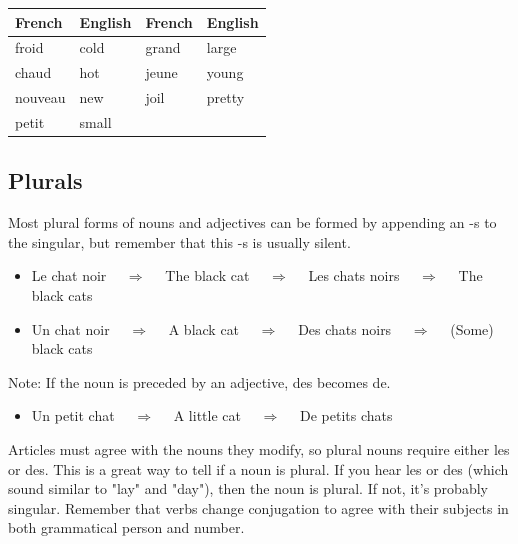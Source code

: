 \begin{center}\begin{tabular}{l|l||l|l}
\textbf{French} & \textbf{English} & \textbf{French} & \textbf{English} \\ \hline
froid & cold & grand & large \\
chaud & hot & jeune & young \\
nouveau & new & joil & pretty \\
petit & small \\
\end{tabular}\end{center}


\pagebreak
\subsection{Plurals}

Most plural forms of nouns and adjectives can be formed by appending an -s to the singular, but remember that this -s is usually silent.

\begin{itemize}
  \item  Le chat noir $\quad\Rightarrow\quad$ The black cat $\quad\Rightarrow\quad$ Les chats noirs $\quad\Rightarrow\quad$ The black cats
  \item  Un chat noir $\quad\Rightarrow\quad$ A black cat $\quad\Rightarrow\quad$ Des chats noirs $\quad\Rightarrow\quad$ (Some) black cats
\end{itemize}

Note: If the noun is preceded by an adjective, des becomes de.

\begin{itemize}
  \item  Un petit chat $\quad\Rightarrow\quad$ A little cat $\quad\Rightarrow\quad$ De petits chats
\end{itemize}

Articles must agree with the nouns they modify, so plural nouns require either les or des. This is a great way to tell if a noun is plural. If you hear les or des (which sound similar to "lay" and "day"), then the noun is plural. If not, it's probably singular.  Remember that verbs change conjugation to agree with their subjects in both grammatical person and number.

